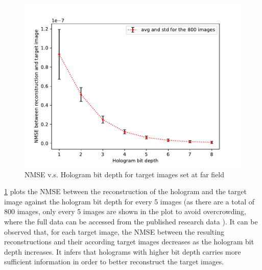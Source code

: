 	\begin{figure} [H]
	   \begin{center}
	   \includegraphics[width = \textwidth]{GS_Fraunhofer_NMSE_VS_Hologram bit depth.pdf}
	   \end{center}
	   \caption{\label{fig:GS_Fraunhofer_NMSE_VS_Hologram_bit_depth} NMSE v.s. Hologram bit depth for target images set at far field}
	\end{figure}

	\cref{fig:GS_Fraunhofer_NMSE_VS_Hologram_bit_depth} plots the NMSE between the reconstruction of the hologram and the target image against the hologram bit depth for every 5 images (as there are a total of 800 images, only every 5 images are shown in the plot to avoid overcrowding, where the full data can be accessed from the published research data \cite{research_data_Sha2024}). It can be observed that, for each target image, the NMSE between the resulting reconstructions and their according target images decreases as the hologram bit depth increases. It infers that holograms with higher bit depth carries more sufficient information in order to better reconstruct the target images.

